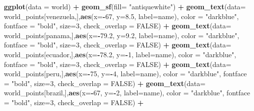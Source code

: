 \documentclass[12pt,oneside]{reedthesis}
\newenvironment{Shaded}{\begin{snugshade}}{\end{snugshade}}
\newcommand{\DataTypeTok}[1]{\textcolor[rgb]{0.13,0.29,0.53}{#1}}
\newcommand{\DecValTok}[1]{\textcolor[rgb]{0.00,0.00,0.81}{#1}}
\newcommand{\FloatTok}[1]{\textcolor[rgb]{0.00,0.00,0.81}{#1}}
\newcommand{\KeywordTok}[1]{\textcolor[rgb]{0.13,0.29,0.53}{\textbf{#1}}}
\newcommand{\NormalTok}[1]{#1}
\newcommand{\OperatorTok}[1]{\textcolor[rgb]{0.81,0.36,0.00}{\textbf{#1}}}
\newcommand{\OtherTok}[1]{\textcolor[rgb]{0.56,0.35,0.01}{#1}}
\newcommand{\StringTok}[1]{\textcolor[rgb]{0.31,0.60,0.02}{#1}}
\begin{document}
\begin{Shaded}
\begin{Highlighting}[]
\KeywordTok{ggplot}\NormalTok{(}\DataTypeTok{data =}\NormalTok{ world) }\OperatorTok{+}\StringTok{ }
\StringTok{  }\KeywordTok{geom_sf}\NormalTok{(}\DataTypeTok{fill=} \StringTok{"antiquewhite"}\NormalTok{) }\OperatorTok{+}\StringTok{ }
\StringTok{  }\KeywordTok{geom_text}\NormalTok{(}\DataTypeTok{data=}\NormalTok{ world_points[venezuela,],}\KeywordTok{aes}\NormalTok{(}\DataTypeTok{x=}\OperatorTok{-}\DecValTok{67}\NormalTok{, }\DataTypeTok{y=}\FloatTok{8.5}\NormalTok{, }\DataTypeTok{label=}\NormalTok{name), }\DataTypeTok{color =} \StringTok{"darkblue"}\NormalTok{, }\DataTypeTok{fontface =} \StringTok{"bold"}\NormalTok{, }\DataTypeTok{size=}\DecValTok{3}\NormalTok{, }\DataTypeTok{check_overlap =} \OtherTok{FALSE}\NormalTok{) }\OperatorTok{+}
\StringTok{  }\KeywordTok{geom_text}\NormalTok{(}\DataTypeTok{data=}\NormalTok{ world_points[panama,],}\KeywordTok{aes}\NormalTok{(}\DataTypeTok{x=}\OperatorTok{-}\FloatTok{79.2}\NormalTok{, }\DataTypeTok{y=}\FloatTok{9.2}\NormalTok{, }\DataTypeTok{label=}\NormalTok{name), }\DataTypeTok{color =} \StringTok{"darkblue"}\NormalTok{, }\DataTypeTok{fontface =} \StringTok{"bold"}\NormalTok{, }\DataTypeTok{size=}\DecValTok{3}\NormalTok{, }\DataTypeTok{check_overlap =} \OtherTok{FALSE}\NormalTok{) }\OperatorTok{+}\StringTok{ }
\StringTok{  }\KeywordTok{geom_text}\NormalTok{(}\DataTypeTok{data=}\NormalTok{ world_points[ecuador,],}\KeywordTok{aes}\NormalTok{(}\DataTypeTok{x=}\OperatorTok{-}\FloatTok{78.2}\NormalTok{, }\DataTypeTok{y=}\OperatorTok{-}\DecValTok{1}\NormalTok{, }\DataTypeTok{label=}\NormalTok{name), }\DataTypeTok{color =} \StringTok{"darkblue"}\NormalTok{, }\DataTypeTok{fontface =} \StringTok{"bold"}\NormalTok{, }\DataTypeTok{size=}\DecValTok{3}\NormalTok{, }\DataTypeTok{check_overlap =} \OtherTok{FALSE}\NormalTok{) }\OperatorTok{+}
\StringTok{  }\KeywordTok{geom_text}\NormalTok{(}\DataTypeTok{data=}\NormalTok{ world_points[peru,],}\KeywordTok{aes}\NormalTok{(}\DataTypeTok{x=}\OperatorTok{-}\DecValTok{75}\NormalTok{, }\DataTypeTok{y=}\OperatorTok{-}\DecValTok{4}\NormalTok{, }\DataTypeTok{label=}\NormalTok{name), }\DataTypeTok{color =} \StringTok{"darkblue"}\NormalTok{, }\DataTypeTok{fontface =} \StringTok{"bold"}\NormalTok{, }\DataTypeTok{size=}\DecValTok{3}\NormalTok{, }\DataTypeTok{check_overlap =} \OtherTok{FALSE}\NormalTok{) }\OperatorTok{+}
\StringTok{  }\KeywordTok{geom_text}\NormalTok{(}\DataTypeTok{data=}\NormalTok{ world_points[brazil,],}\KeywordTok{aes}\NormalTok{(}\DataTypeTok{x=}\OperatorTok{-}\DecValTok{67}\NormalTok{, }\DataTypeTok{y=}\OperatorTok{-}\DecValTok{2}\NormalTok{, }\DataTypeTok{label=}\NormalTok{name), }\DataTypeTok{color =} \StringTok{"darkblue"}\NormalTok{, }\DataTypeTok{fontface =} \StringTok{"bold"}\NormalTok{, }\DataTypeTok{size=}\DecValTok{3}\NormalTok{, }\DataTypeTok{check_overlap =} \OtherTok{FALSE}\NormalTok{) }\OperatorTok{+}

\end{Highlighting}
\end{Shaded}
\end{document}
